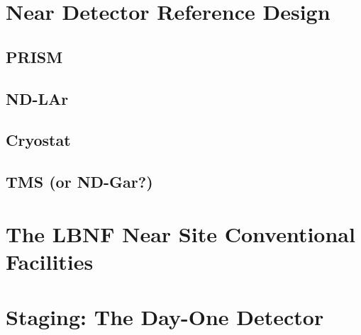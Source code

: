 \section{Near Detector Reference Design}
\label{intro:refdes}



\subsection{PRISM}
\label{intro:refdes-prism}



\subsection{ND-LAr}
\label{intro:refdes-ndlar}

\subsection{Cryostat}
\label{intro:refdes-cryostat}

\subsection{TMS (or ND-Gar?)}
\label{intro:refdes-tms}





\section{The LBNF Near Site Conventional Facilities}
\label{intro:lbnf}



\section{Staging: The Day-One Detector}
\label{intro:staging}

